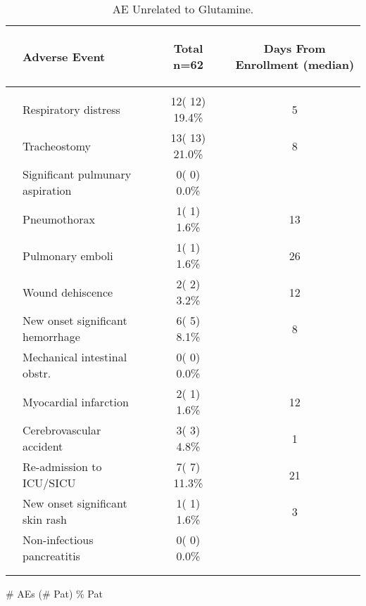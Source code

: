 \documentclass[dvips,10pt]{article}
\begin{document}
\begin{table}[t]
\caption
{ AE Unrelated to Glutamine. }
\begin{center}
\begin{tabular}{ @{}l@{}
@{}l@{}@{}p{1.5em}@{}@{}c@{}@{}p{1.5em}@{}@{}c@{}
}
\hline

& \parbox{6em}{\begin{center}Adverse Event\end{center}} && \parbox{6em}{\begin{center}Total n=62\end{center}} && \parbox{6em}{\begin{center}Days From Enrollment  (median)\end{center}} \\

\hline

\\
& Respiratory distress && 12( 12) 19.4\% && 5 \\
& Tracheostomy && 13( 13) 21.0\% && 8 \\
& Significant pulmunary aspiration && 0(  0)  0.0\% &&  \\
& Pneumothorax && 1(  1)  1.6\% && 13 \\
& Pulmonary emboli && 1(  1)  1.6\% && 26 \\
& Wound dehiscence && 2(  2)  3.2\% && 12 \\
& New onset significant hemorrhage && 6(  5)  8.1\% && 8 \\
& 
Mechanical intestinal obstr. && 0(  0)  0.0\% &&  \\
& Myocardial infarction && 2(  1)  1.6\% && 12 \\
& Cerebrovascular accident && 3(  3)  4.8\% && 1 \\
& Re-admission to ICU/SICU && 7(  7) 11.3\% && 21 \\
& New onset significant skin rash && 1(  1)  1.6\% && 3 \\
& 
Non-infectious pancreatitis && 0(  0)  0.0\% &&  \\
\\
\hline \\

\end{tabular}


\parbox{ 5in }{ \# AEs (\# Pat) \% Pat } \\
 \vspace{1em}\end{center}
 \end{table}
\end{document}
